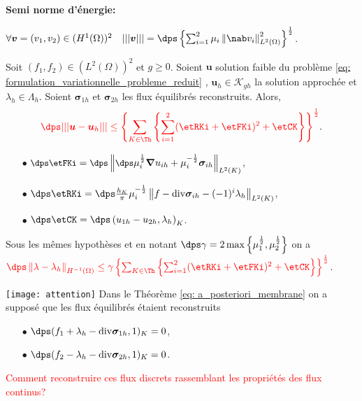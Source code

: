 \documentclass{beamer}
\renewcommand{\div}{\mathrm{div}}
\begin{document}
\begin{frame}
\textbf{Semi norme d'énergie:}

$\forall {\bm v}=(v_1,v_2) \in (H^1(\Omega))^2 \quad |||{\bm v}|||=\dps \left\{\sum_{i=1}^2 \mu_i\left\|\nab v_i\right\|_{L^2(\Omega)}^2\right\}^{\frac{1}{2}}$.

\begin{theorem}
Soit $(f_1,f_2) \in (L^2(\Omega))^2$ et $g \geq 0$. Soient ${\bm u}$ solution faible du problème \eqref{eq: formulation_variationnelle_probleme_reduit} ,
${\bm u}_h\in \mathcal{K}_{gh}$ la solution approchée et $\lambda_h \in \Lambda_h$. Soient 
 ${\bm{\sigma}}_{1h}$ et ${\bm{\sigma}}_{2h}$ les flux équilibrés reconstruits. Alors, \vspace{-0.4 cm}
 \begin{equation}
 \textcolor{red}{\dps |||{\bm u}-{\bm u}_h|||\leq \left\{\sum_{K\in\Th}\left\{\sum_{i=1}^2(\etRKi+\etFKi)^2+\etCK\right\}\right\}^{\frac{1}{2}}}.
 \label{eq: a_posteriori_membrane} 
 \end{equation}

\vspace{-0.6 cm}
\begin{itemize}
\item[$\bullet$]${\small \dps \etFKi=\dps \left\|\dps \mu_i^{\frac{1}{2}} {\bm \nabla} u_{ih}+\mu_i^{-\frac{1}{2}} {\bm{\sigma}}_{ih}\right\|_{L^2(K)}}$,
\item[$\bullet$]$\dps \etRKi=\dps \frac{h_K}{\pi} \mu_i^{-\frac{1}{2}} \left\|f-\div {\bm{\sigma}}_{ih}-(-1)^i \lambda_h\right\|_{L^2(K)}$,
\item[$\bullet$]$\dps \etCK =\dps \left( u_{1h}-u_{2h},\lambda_h\right)_K$.
\end{itemize}

\end{theorem}
\end{frame}
\begin{frame}
\begin{corollary}
Sous les mêmes hypothèses et en notant $\dps \gamma=2 \max \left\{\mu_1^{\frac{1}{2}},\mu_2^{\frac{1}{2}}\right\}$ on a
$\textcolor{red}{\dps \left\|\lambda-\lambda_h\right\|_{H^{-1}(\Omega)}\leq \gamma\left\{\sum_{K\in\Th}\left\{\sum_{i=1}^2(\etRKi+\etFKi)^2+\etCK\right\}\right\}^{\frac{1}{2}}}$.
\end{corollary}
\texttt{[image: attention]} \quad
Dans le Théorème \eqref{eq: a_posteriori_membrane}  on a supposé que les flux équilibrés étaient reconstruits \ie
\begin{itemize}
\item[$\bullet$]$
\dps (f_1+\lambda_h-\div {\bm \sigma}_{1h},1)_K=0$,
\item[$\bullet$]$ 
\dps (f_2-\lambda_h-\div {\bm \sigma}_{2h},1)_K=0$.
\end{itemize}
\textcolor{red}{Comment reconstruire ces flux discrets rassemblant les propriétés des flux continus?}
\end{frame}
\end{document}
